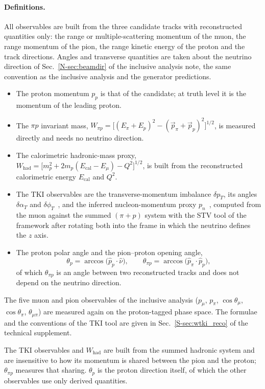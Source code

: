 \documentclass[11pt,a4paper]{article}
\newcommand{\suppref}[2]{#1~\ref{S-#2} of the technical supplement}
\newcommand{\noteref}[2]{#1~\ref{N-#2} of the inclusive analysis note}
\begin{document}
\paragraph{Definitions.} All observables are built from the three candidate tracks with
reconstructed quantities only: the range or multiple-scattering momentum of the muon, the range
momentum of the pion, the range kinetic energy of the proton and the track directions. Angles and
transverse quantities are taken about the neutrino direction of \noteref{Sec.}{sec:beamdir}, the
same convention as the inclusive analysis and the generator predictions.
\begin{itemize}\itemsep2pt
  \item The proton momentum $p_p$ is that of the candidate; at truth level it is the momentum of the
    leading proton.
  \item The $\pi p$ invariant mass, $W_{\pi p}=\big[(E_\pi+E_p)^2-(\vec p_\pi+\vec p_p)^2\big]^{1/2}$,
    is measured directly and needs no neutrino direction.
  \item The calorimetric hadronic-mass proxy,
    $W_\mathrm{had}=\big[m_p^2+2m_p(E_\mathrm{cal}-E_\mu)-Q^2\big]^{1/2}$, is built from the
    reconstructed calorimetric energy $E_\mathrm{cal}$ and $Q^2$.
  \item The TKI observables are the transverse-momentum imbalance $\delta p_T$, its angles
    $\delta\alpha_T$ and $\delta\phi_T$~\cite{lu_tki}, and the inferred nucleon-momentum proxy
    $p_n$~\cite{furmanski_pn}, computed from the muon against the summed $(\pi+p)$ system with the
    STV tool of the framework after rotating both into the frame in which the neutrino defines the
    $z$ axis.
  \item The proton polar angle and the pion--proton opening angle,
    \[
      \theta_p=\arccos\!\big(\hat p_p\cdot\hat\nu\big), \qquad
      \theta_{\pi p}=\arccos\!\big(\hat p_\pi\cdot\hat p_p\big),
    \]
    of which $\theta_{\pi p}$ is an angle between two reconstructed tracks and does not depend on
    the neutrino direction.
\end{itemize}
The five muon and pion observables of the inclusive analysis ($p_\mu$, $p_\pi$, $\cos\theta_\mu$,
$\cos\theta_\pi$, $\theta_{\mu\pi}$) are measured again on the proton-tagged phase space. The
formulae and the conventions of the TKI tool are given in \suppref{Sec.}{sec:wtki_reco}.

The TKI observables and $W_\mathrm{had}$ are built from the summed hadronic system and are
insensitive to how its momentum is shared between the pion and the proton; $\theta_{\pi p}$ measures
that sharing. $\theta_p$ is the proton direction itself, of which the other observables use only
derived quantities.
\end{document}
